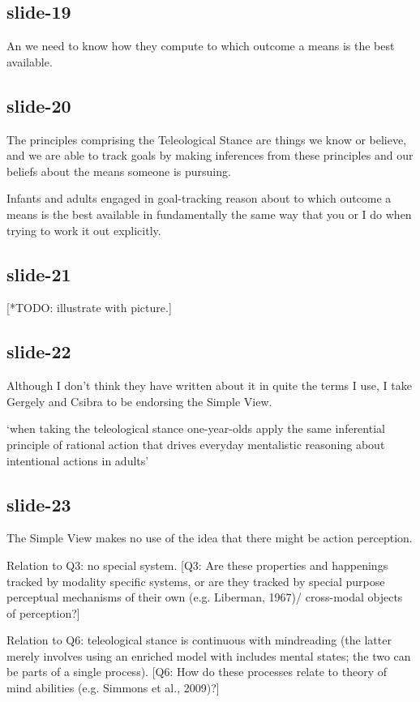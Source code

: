 \documentclass[12pt,\papersize]{extarticle}
\begin{document}
\subsection{slide-19}
An we need to know how they compute to which outcome a means is the best available.
 
\subsection{slide-20}
The principles comprising the Teleological Stance are things we know or believe, and we are
able to track goals by making inferences from these principles and our beliefs about the
means someone is pursuing.
 
Infants and adults engaged in goal-tracking reason about 
to which outcome a means is the best available
in fundamentally the same way that you or I do when trying to work it out explicitly.
 
\subsection{slide-21}
[*TODO: illustrate with picture.]
 
\subsection{slide-22}
Although I don’t think they have written about it in quite the terms I use,
I take Gergely and Csibra to be endorsing the Simple View.
 
‘when taking the teleological stance one-year-olds apply the same
inferential principle of rational action that drives everyday mentalistic
reasoning about intentional actions in adults’
 
\subsection{slide-23}
The Simple View makes no use of the idea that there might be action perception.
 
Relation to Q3: no special system.
[Q3: Are these properties and happenings tracked by modality specific systems, or are they tracked by
special purpose perceptual mechanisms of their own (e.g. Liberman, 1967)/ cross-modal objects of
perception?]
 
Relation to Q6: teleological stance is continuous with mindreading (the latter merely involves
using an enriched model with includes mental states; the two can be parts of a single process).
[Q6: How do these processes relate to theory of mind abilities (e.g. Simmons et al., 2009)?]
 
\end{document}
